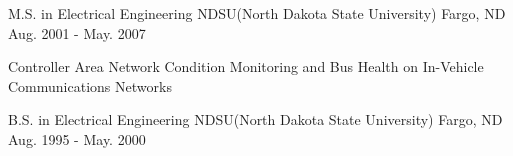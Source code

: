 

\begin{cventries}

  \cventry
    {M.S. in Electrical Engineering} %
    {NDSU(North Dakota State University)} %
    {Fargo, ND} %
    {Aug. 2001 - May. 2007} %
    {
      \begin{cvitems} %
        \item {Controller Area Network Condition Monitoring and Bus Health on In-Vehicle Communications Networks}
      \end{cvitems}
    }

  \cventry
    {B.S. in Electrical Engineering} %
    {NDSU(North Dakota State University)} %
    {Fargo, ND} %
    {Aug. 1995 - May. 2000} %
    {
      \begin{cvitems} %
      \end{cvitems}
    }


\end{cventries}
